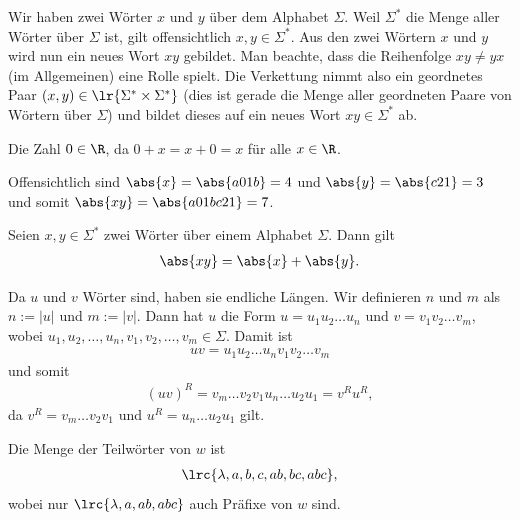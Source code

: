 \begin{myanswer}[myexercise:0203]
	Wir haben zwei Wörter $x$ und $y$ über dem Alphabet $\Sigma$. Weil $\Sigma^*$ die Menge aller Wörter über $\Sigma$ ist, gilt offensichtlich $x,y\in\Sigma^*$. Aus den zwei Wörtern $x$ und $y$ wird nun ein neues Wort $xy$ gebildet. Man beachte, dass die Reihenfolge $xy\neq yx$ (im Allgemeinen) eine Rolle spielt.	Die Verkettung nimmt also ein geordnetes Paar $(x,y)\in \lr{\Sigma^*\times \Sigma^*}$ (dies ist gerade die Menge aller geordneten Paare von Wörtern über $\Sigma$) und bildet dieses auf ein neues Wort $xy\in\Sigma^*$ ab.
\end{myanswer}

\begin{myanswer}[myexercise:0204]
	Die Zahl $0\in\R$, da $0+x = x+0 = x$ für alle $x\in\R$.
\end{myanswer}

\begin{myanswer}[myexercise:0205]
	Offensichtlich sind $\abs{x} = \abs{a01b}= 4$ und $\abs{y} = \abs{c21} = 3$ und somit $\abs{xy} = \abs{a01bc21} = 7$.

	Seien  $x,y\in\Sigma^*$ zwei Wörter über einem Alphabet $\Sigma$. Dann gilt
	\begin{align*}
		\abs{xy} = \abs{x}+\abs{y}.
	\end{align*}
\end{myanswer}

\begin{myanswer}[myexercise:0206]
	Da $u$ und $v$ Wörter sind, haben sie endliche Längen. Wir definieren $n$ und $m$ als $n := |u|$ und $m := |v|$. Dann hat $u$ die Form $u = u_1u_2\ldots u_n$ und $v = v_1v_2\ldots v_m$, wobei $u_1,u_2,\ldots ,u_n,v_1,v_2,\ldots ,v_m\in\Sigma$. Damit ist
	\begin{align*}
		uv = u_1u_2\ldots u_nv_1v_2\ldots v_m
	\end{align*}
	und somit
	\begin{align*}
		(uv)^R = v_m\ldots v_2v_1u_n\ldots u_2u_1 = v^Ru^R,
	\end{align*}
	da $v^R = v_m\ldots v_2v_1$ und $u^R = u_n\ldots u_2u_1$ gilt.
\end{myanswer}


\begin{myanswer}[myexercise:0299]
	Die Menge der Teilwörter von $w$ ist
	\begin{align*}
		\lrc{\lambda, a, b, c, ab, bc, abc},
	\end{align*}
	wobei nur $\lrc{\lambda, a, ab, abc}$ auch Präfixe von $w$ sind.
\end{myanswer}


